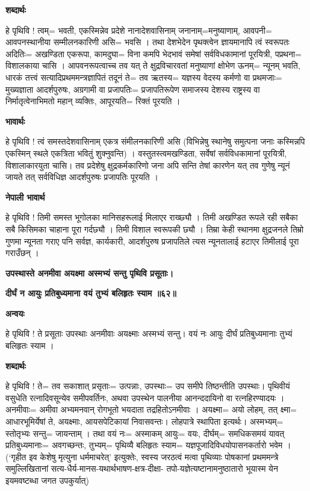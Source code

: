 \documentclass[11pt, a5paper]{article}
\begin{document}
\textbf{शब्दार्थः}

हे पृथिवि ! त्वम्= भवती, एकस्मिन्नेव प्रदेशे नानादेशवासिनाम् जनानाम्=मनुष्याणाम्, आवपनी= आवपनस्थानीया सम्मीलनकारिणी असि= भवसि । तथा देशभेदेन पृथक्त्वेन ज्ञायमानापि त्वं स्वरूपतः अदितिः= अखण्डिता एकरूपा, कामदुघा= विना कमपि भेदभावं समेषां सर्वविधकामानां पूरयित्री, पप्रथना= विशालकाया चासि । आपवनरूपत्वाच्च तव यत् ते क्षुद्रविचारवतां मनुष्याणां क्षोभेण ऊनम्= न्यूनम् भवति, धारकं तत्त्वं सत्यादिप्रथममन्त्रज्ञापितं तदूनं ते= तव ऋतस्य= यज्ञस्य वेदस्य कर्मणो वा प्रथमजाः= मुख्यज्ञाता आदर्शपुरुषः, अग्रगामी वा प्रजापतिः= प्रजापतिरूपेण समाजस्य देशस्य राष्ट्रस्य वा निर्मातृत्वेनाभिमतो महान् व्यक्तिः, आपूरयति= रिक्तं पूरयति ।

\textbf{भावार्थः}

हे पृथिवि ! त्वं समस्तदेशवासिनाम् एकत्र संमीलनकारिणी असि (विभिन्नेषु स्थानेषु समुत्पना जनाः कस्मिन्नपि एकस्मिन् स्थले एकत्रिता भवितुं शुक्नुवन्ति) । वस्तुतस्त्वमखण्डिता, सर्वेषां सर्वविधकामानां पूरयित्री, विशालाकारयुता चासि। तव प्रदेशेषु क्षुद्रकर्मकारिणो जना अपि सन्ति तेषां कारणेन यत् तव गुणेषु न्यूनं जायते तत् सर्वविधिज्ञ आदर्शपुरुषः प्रजापतिः पूरयति ।

\textbf{नेपाली भावार्थ}

हे पृथिवि ! तिमी समस्त भूगोलका मानिसहरूलाई मिलाएर राख्छ्यौ । तिमी अखण्डित रूपले रही सबैका सबै किसिमका चाहाना पूरा गर्दछ्यौ । तिमी विशाल स्वरूपकी छ्यौ । तिम्रा केही स्थानमा क्षुद्रजनले तिम्रो गुणमा न्यूनता गराए पनि सर्वज्ञ, कार्यकारी, आदर्शपुरुष प्रजापतिले त्यस न्यूनतालाई हटाएर तिमीलाई पूरा गराउँछन् ।

\textbf{उपस्थास्ते अनमीवा अयक्ष्मा अस्मभ्यं सन्तु पृथिवि प्रसूताः।}

\textbf{दीर्घं न आयुः प्रतिबुध्यमाना वयं तुभ्यं बलिहृतः स्याम ॥६२॥}

\textbf{अन्वयः}

हे पृथिवि ! ते प्रसूताः उपस्थाः अनमीवाः अयक्ष्माः अस्मभ्यं सन्तु। वयं नः आयुः दीर्घं प्रतिबुध्यमानाः तुभ्यं बलिहृतः स्याम ।

\textbf{शब्दार्थः}

हे पृथिवि ! ते= तव सकाशात् प्रसृताः= उत्पन्नाः, उपस्थाः= उप समीपे तिष्ठन्तीति उपस्थाः। पृथिवीयं वसुधेति रत्नादिवसून्येव समीपवर्तिनः, अथवा उपस्थेन पालनीया आनन्ददायिनो वा रत्नहिरण्यादयः । अनमीवाः= अमीवा अभ्यमनवान् रोगभूतो भयदाता तद्रहितोऽनमीवाः । अयक्ष्मा= अयो लोहम्, तत् क्ष्मा= आधारभूमिर्येषां ते, अयक्ष्माः, आयसपेटिकायां निवासवन्तः। लोहपात्रे स्थापिता इत्यर्थः। अस्मभ्यम्= स्तोतृभ्यः सन्तु= जायन्ताम् । तथा वयं नः= अस्माकम् आयुः= वयः, दीर्घम्= समधिकसमयं यावत् प्रतिबुध्यमानाः= अवगच्छन्तः, तुभ्यम्= पृथिव्यै बलिहृतः स्याम= यज्ञपूजादिविधयोपासनकर्तारो भवेम । (‘गृहीत इव केशेषु मृत्युना धर्ममाचरेत्’ इत्युक्तेः, स्वस्य जरठत्वं मत्वा पृथिव्याः पोषकानां प्रथममन्त्रे समुल्लिखितानां सत्य-धैर्य-मानस-यथार्थभाषण-क्षत्र-दीक्षा- तपो-यज्ञेत्यष्टानामनुष्ठातारो भूयास्म येन इयमवष्टब्धा जगत उपकुर्यात्)
\end{document}
